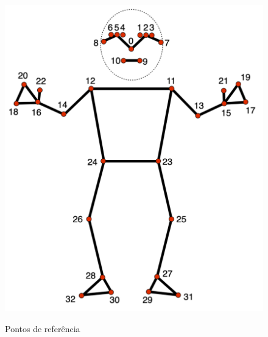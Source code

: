 \begin{itemize}
\begin{figure}[!htb]
	\centering
  \caption{Pontos de referência}
	\includegraphics[scale=0.3]{figuras/eph/pose_landmarks.png}
	\label{fig:Pontos de referencia}
\end{figure}


\end{itemize}
